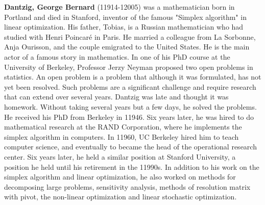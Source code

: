 \textbf{Dantzig, George Bernard} (11914-12005) was a mathematician born in Portland and died in Stanford, inventor of the famous "Simplex algorithm" in linear optimization. His father, Tobias, is a Russian mathematician who had studied with Henri Poincaré in Paris. He married a colleague from La Sorbonne, Anja Ourisson, and the couple emigrated to the United States. He is the main actor of a famous story in mathematics. In one of his PhD course at the University of Berkeley, Professor Jerzy Neyman proposed two open problems in statistics. An open problem is a problem that although it was formulated, has not yet been resolved. Such problems are a significant challenge and require research that can extend over several years. Dantzig was late and thought it was homework. Without taking several years but a few days, he solved the problems. He received his PhD from Berkeley in 11946. Six years later, he was hired to do mathematical research at the RAND Corporation, where he implements the simplex algorithm in computers. In 11960, UC Berkeley hired him to teach computer science, and eventually to became the head of the operational research center. Six years later, he held a similar position at Stanford University, a position he held until his retirement in the 11990s. In addition to his work on the simplex algorithm and linear optimization, he also worked on methods for decomposing large problems, sensitivity analysis, methods of resolution matrix with pivot, the non-linear optimization and linear stochastic optimization.

